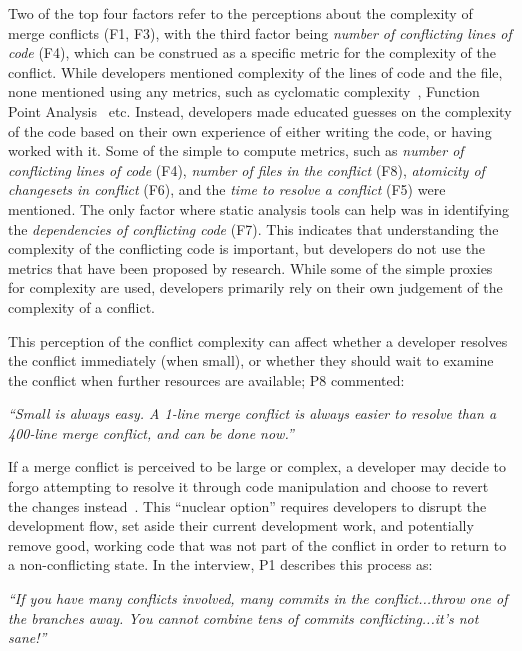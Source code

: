 \label{artifact-based-factors}
Two of the top four factors refer to the perceptions about the complexity of merge conflicts (F1, F3), with the third factor being \textit{number of conflicting lines of code} (F4), which can be construed as a specific metric for the complexity of the conflict. 
While developers mentioned complexity of the lines of code and the file, none mentioned using any metrics, such as cyclomatic complexity~\cite{fenton2000quantitative,mccabe1976complexity}, Function Point Analysis~\cite{garmus2001fpa,symons1988function} etc. 
Instead, developers made educated guesses on the complexity of the code based on their own experience of either writing the code, or having worked with it. 
Some of the simple to compute metrics, such as \textit{number of conflicting lines of code} (F4), \textit{number of files in the conflict} (F8), \textit{atomicity of changesets in conflict} (F6), and the \textit{time to resolve a conflict} (F5) were mentioned. 
The only factor where static analysis tools can help was in identifying the \textit{dependencies of conflicting code} (F7).
This indicates that understanding the complexity of the conflicting code is important, but developers do not use the metrics that have been proposed by research.
While some of the simple proxies for complexity are used, developers primarily rely on their own judgement of the complexity of a conflict.

This perception of the conflict complexity can affect whether a developer resolves the conflict immediately (when small), or whether they should wait to examine the conflict when further resources are available; P8 commented:
\begin{quoting}
\textit{``Small is always easy. A 1-line merge conflict is always easier to resolve than a 400-line merge conflict, and can be done now.''}
\end{quoting}

If a merge conflict is perceived to be large or complex, a developer may decide to forgo attempting to resolve it through code manipulation and choose to revert the changes instead~\cite{Guzzi2015}.
This ``nuclear option'' requires developers to disrupt the development flow, set aside their current development work, and potentially remove good, working code that was not part of the conflict in order to return to a non-conflicting state.
In the interview, P1 describes this process as:
\begin{quoting}
\textit{``If you have many conflicts involved, many commits in the conflict...throw one of the branches away. You cannot combine tens of commits conflicting...it's not sane!''}
\end{quoting}

